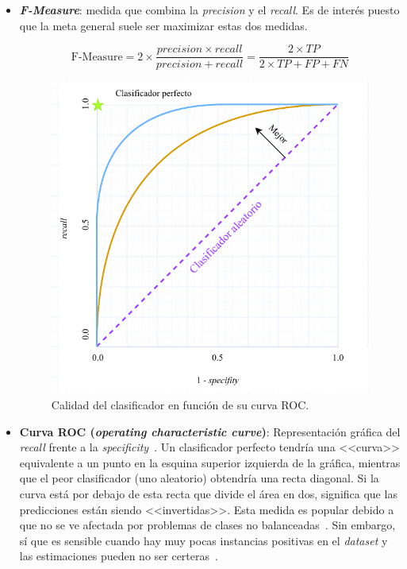\begin{itemize}
	
	\item \textbf{\textit{F-Measure}}: medida que combina la \textit{precision} y el \textit{recall}. Es de interés puesto que la meta general suele ser maximizar estas dos medidas.
	
	\begin{equation}\label{eqn:f-measure} \textrm{F-Measure} = 2 \times \frac{precision \times recall}{precision + recall} = \frac{ 2 \times TP}{2 \times TP + FP + FN} \end{equation}
	
	\begin{figure}[h]
		\caption[Métricas: curva ROC]{Calidad del clasificador en función de su curva ROC.}
		\label{img:curva_roc}
		\centering
		\includegraphics[scale=0.8]{../img/memoria/3_curva_roc}
	\end{figure}	
	
	\item \textbf{Curva ROC (\textit{operating characteristic curve})}: Representación gráfica del \textit{recall} frente a la \textit{specificity}~\cite{AUC2022google}. Un clasificador perfecto tendría una <<curva>> equivalente a un punto en la esquina superior izquierda de la gráfica, mientras que el peor clasificador (uno aleatorio) obtendría una recta diagonal. Si la curva está por debajo de esta recta que divide el área en dos, significa que las predicciones están siendo <<invertidas>>. Esta medida es popular debido a que no se ve afectada por problemas de clases no balanceadas~\cite{AUC2020imbalanced}. Sin embargo, sí que es sensible cuando hay muy pocas instancias positivas en el \textit{dataset} y las estimaciones pueden no ser certeras~\cite{leaningImbalanced2018Salvador}.
	

\end{itemize}
